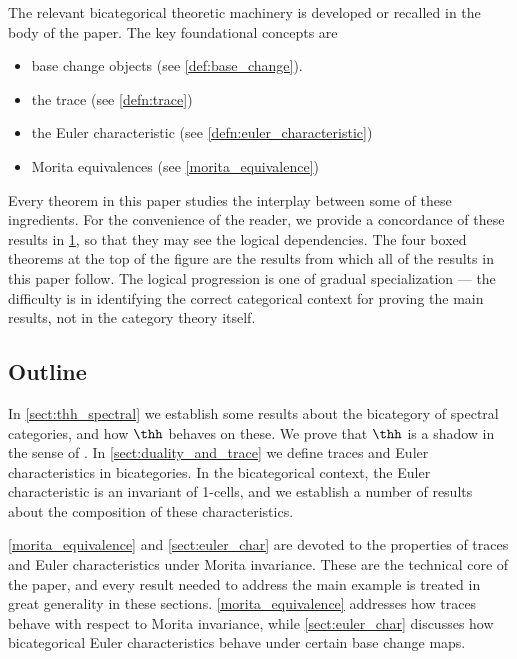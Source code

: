 \documentclass[11pt]{amsart}
\begin{document}
The relevant bicategorical theoretic machinery is developed or recalled in the body of the paper. The key foundational concepts are
\begin{itemize}
  \item base change objects (see \cref{def:base_change}). 
  \item the trace (see \cref{defn:trace})
  \item the Euler characteristic (see \cref{defn:euler_characteristic})
  \item Morita equivalences (see \cref{morita_equivalence})
\end{itemize}
Every theorem in this paper studies the interplay between some of these ingredients. For the convenience of the reader, we provide a concordance of these results in \cref{fig:concordance}, so that they may see the logical dependencies. The four boxed theorems at the top of the figure  are the results from which all of the results in this paper follow. The logical progression is one of gradual specialization --- the difficulty is in identifying the correct categorical context for proving the main results, not in the category theory itself. 
\begin{figure}[omitted: a diagram of this paper's results, not reproduced here]\label{fig:concordance}\end{figure}


\subsection{Outline}

In \cref{sect:thh_spectral} we establish some results about the bicategory of spectral categories, and how $\thh$ behaves on these. We prove that $\thh$ is a shadow in the sense of \cite{p:thesis}. In \cref{sect:duality_and_trace} we define traces and Euler characteristics in bicategories. In the bicategorical context, the Euler characteristic is an invariant of 1-cells, and we establish a number of results about the composition of these characteristics. 

\cref{morita_equivalence} and \cref{sect:euler_char} are devoted to the properties of traces and Euler characteristics under Morita invariance. These are the technical core of the paper, and every result needed to address the main example is treated in great generality in these sections. \cref{morita_equivalence} addresses how traces behave with respect to Morita invariance, while \cref{sect:euler_char} discusses how bicategorical Euler characteristics behave under certain base change maps. 
\end{document}
